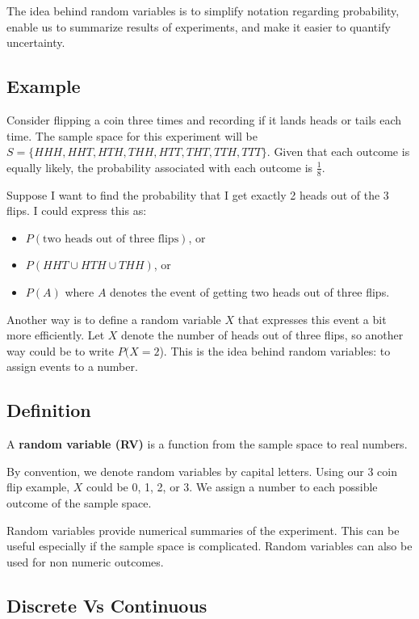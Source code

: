 \documentclass[
]{book}
\providecommand{\tightlist}{%
  \setlength{\itemsep}{0pt}\setlength{\parskip}{0pt}}
\begin{document}
The idea behind random variables is to simplify notation regarding probability, enable us to summarize results of experiments, and make it easier to quantify uncertainty.

\subsection{Example}\label{example}

Consider flipping a coin three times and recording if it lands heads or tails each time. The sample space for this experiment will be \(S = \{HHH, HHT, HTH, THH, HTT, THT, TTH, TTT\}\). Given that each outcome is equally likely, the probability associated with each outcome is \(\frac{1}{8}\).

Suppose I want to find the probability that I get exactly 2 heads out of the 3 flips. I could express this as:

\begin{itemize}
\tightlist
\item
  \(P(\text{two heads out of three flips})\), or
\item
  \(P(HHT \cup HTH \cup THH)\), or
\item
  \(P(A)\) where \(A\) denotes the event of getting two heads out of three flips.
\end{itemize}

Another way is to define a random variable \(X\) that expresses this event a bit more efficiently. Let \(X\) denote the number of heads out of three flips, so another way could be to write \(P(X=2\)). This is the idea behind random variables: to assign events to a number.

\subsection{Definition}\label{definition}

A \textbf{random variable (RV)} is a function from the sample space to real numbers.

By convention, we denote random variables by capital letters. Using our 3 coin flip example, \(X\) could be 0, 1, 2, or 3. We assign a number to each possible outcome of the sample space.

Random variables provide numerical summaries of the experiment. This can be useful especially if the sample space is complicated. Random variables can also be used for non numeric outcomes.

\subsection{Discrete Vs Continuous}\label{discrete-vs-continuous}
\end{document}

